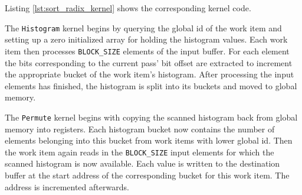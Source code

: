 Listing \ref{lst:sort_radix_kernel} shows the corresponding kernel code.



The \lstinline!Histogram! kernel begins by querying the global id of the work item and setting up a zero initialized array for holding the histogram values. Each work item then processes \lstinline!BLOCK_SIZE! elements of the input buffer. For each element the bits corresponding to the current pass' bit offset are extracted to increment the appropriate bucket of the work item's histogram. After processing the input elements has finished, the histogram is split into its buckets and moved to global memory.

\pagebreak

The \lstinline!Permute! kernel begins with copying the scanned histogram back from global memory into registers. Each histogram bucket now contains the number of elements belonging into this bucket from work items with lower global id. Then the work item again reads in the \lstinline!BLOCK_SIZE! input elements for which the scanned histogram is now available. Each value is written to the destination buffer at the start address of the corresponding bucket for this work item. The address is incremented afterwards.

